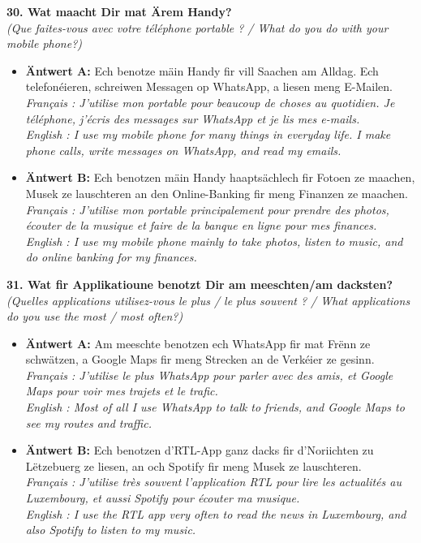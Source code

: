 \noindent\textbf{30. Wat maacht Dir mat Ärem Handy?}\\
\textit{(Que faites-vous avec votre téléphone portable ? / What do you do with your mobile phone?)}
\begin{itemize}
    \item \textbf{Äntwert A:} Ech benotze mäin Handy fir vill Saachen am Alldag. Ech telefonéieren, schreiwen Messagen op WhatsApp, a liesen meng E-Mailen.\\
    \textit{Français : J'utilise mon portable pour beaucoup de choses au quotidien. Je téléphone, j'écris des messages sur WhatsApp et je lis mes e-mails.}\\
    \textit{English : I use my mobile phone for many things in everyday life. I make phone calls, write messages on WhatsApp, and read my emails.}
    \item \textbf{Äntwert B:} Ech benotzen mäin Handy haaptsächlech fir Fotoen ze maachen, Musek ze lauschteren an den Online-Banking fir meng Finanzen ze maachen.\\
    \textit{Français : J'utilise mon portable principalement pour prendre des photos, écouter de la musique et faire de la banque en ligne pour mes finances.}\\
    \textit{English : I use my mobile phone mainly to take photos, listen to music, and do online banking for my finances.}
\end{itemize}
\vspace{0.5em}

\noindent\textbf{31. Wat fir Applikatioune benotzt Dir am meeschten/am dacksten?}\\
\textit{(Quelles applications utilisez-vous le plus / le plus souvent ? / What applications do you use the most / most often?)}
\begin{itemize}
    \item \textbf{Äntwert A:} Am meeschte benotzen ech WhatsApp fir mat Frënn ze schwätzen, a Google Maps fir meng Strecken an de Verkéier ze gesinn.\\
    \textit{Français : J'utilise le plus WhatsApp pour parler avec des amis, et Google Maps pour voir mes trajets et le trafic.}\\
    \textit{English : Most of all I use WhatsApp to talk to friends, and Google Maps to see my routes and traffic.}
    \item \textbf{Äntwert B:} Ech benotzen d'RTL-App ganz dacks fir d'Noriichten zu Lëtzebuerg ze liesen, an och Spotify fir meng Musek ze lauschteren.\\
    \textit{Français : J'utilise très souvent l'application RTL pour lire les actualités au Luxembourg, et aussi Spotify pour écouter ma musique.}\\
    \textit{English : I use the RTL app very often to read the news in Luxembourg, and also Spotify to listen to my music.}
\end{itemize}
\vspace{0.5em}

